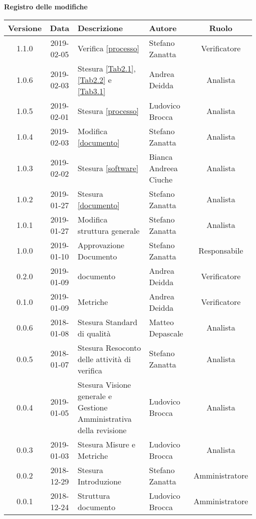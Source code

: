 	\begin{center}
		\textbf{Registro delle modifiche}
	\end{center}
	\begin{center}
		\begin{tabularx}{\textwidth}{|c|c|X|X|c|}
			\hline
			\textbf{Versione} & \textbf{Data} & \textbf{Descrizione} & \textbf{Autore} & \textbf{Ruolo} \\
			\hline
			1.1.0 & 2019-02-05 & Verifica \ref{processo}& Stefano Zanatta & Verificatore\\
			\hline
			1.0.6 & 2019-02-03 & Stesura \ref{Tab2.1}, \ref{Tab2.2} e \ref{Tab3.1} & Andrea Deidda & Analista\\
			\hline
			1.0.5 & 2019-02-01 &Stesura \ref{processo}& Ludovico Brocca & Analista\\
			\hline
			1.0.4 & 2019-02-03 & Modifica \ref{documento}& Stefano Zanatta & Analista\\
			\hline
			1.0.3 & 2019-02-02 & Stesura \ref{software}& Bianca Andreea Ciuche & Analista\\
			\hline
			1.0.2 & 2019-01-27 & Stesura \ref{documento}& Stefano Zanatta & Analista\\
			\hline
			1.0.1 & 2019-01-27 & Modifica struttura generale& Stefano Zanatta & Analista\\
			\hline
			1.0.0 & 2019-01-10 & Approvazione Documento& Stefano Zanatta & Responsabile\\
			\hline
			0.2.0 & 2019-01-09 & \glossario{Verifica} documento & Andrea Deidda & Verificatore\\
			\hline
			0.1.0 & 2019-01-09 & \glossario{Verifica} Metriche & Andrea Deidda & Verificatore\\
			\hline
			0.0.6 & 2018-01-08 & Stesura Standard di qualità & Matteo Depascale & Analista\\
			\hline
			0.0.5 & 2018-01-07 & Stesura Resoconto delle attività di verifica & Stefano Zanatta & Analista\\
			\hline
			0.0.4 & 2019-01-05 & Stesura Visione generale e Gestione Amministrativa della revisione  & Ludovico Brocca& Analista\\
			\hline	
			0.0.3 & 2019-01-03& Stesura Misure e Metriche &Ludovico Brocca & Analista\\
			\hline
			0.0.2 & 2018-12-29 & Stesura Introduzione & Stefano Zanatta & Amministratore\\
			\hline
			0.0.1 & 2018-12-24 & Struttura documento & Ludovico Brocca & Amministratore\\
			\hline
		\end{tabularx}
	\end{center}
\newpage